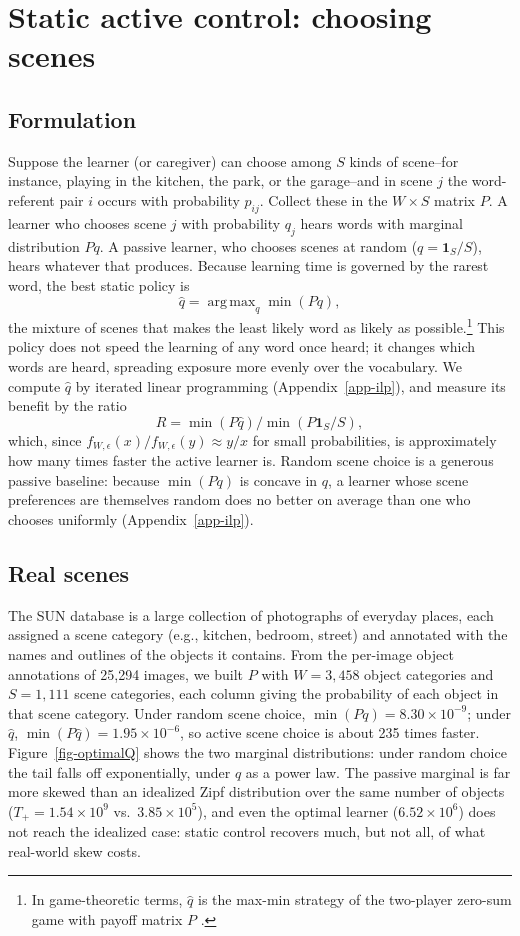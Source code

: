 \documentclass[a4paper,natbib,man]{apa6}
\newcommand{\one}[1]{\mathbf{1}_{#1}}
\DeclareMathOperator*{\argmax}{arg\,max}
\begin{document}
\section{Static active control: choosing scenes}
\label{sec-active}

\subsection{Formulation}
Suppose the learner (or caregiver) can choose among $S$ kinds of scene--for instance, playing in the kitchen, the park, or the garage--and in scene $j$ the word-referent pair $i$ occurs with probability $p_{ij}$. Collect these in the $W \times S$ matrix $P$. A learner who chooses scene $j$ with probability $q_j$ hears words with marginal distribution $Pq$. A passive learner, who chooses scenes at random ($q = \one{S}/S$), hears whatever that produces. Because learning time is governed by the rarest word, the best static policy is
\[
 \hat{q} = \argmax_{q} \min(Pq),
\]
the mixture of scenes that makes the least likely word as likely as possible.\footnote{In game-theoretic terms, $\hat{q}$ is the max-min strategy of the two-player zero-sum game with payoff matrix $P$ \citep{Maschler:2013}.} This policy does not speed the learning of any word once heard; it changes which words are heard, spreading exposure more evenly over the vocabulary. We compute $\hat q$ by iterated linear programming (Appendix~\ref{app-ilp}), and measure its benefit by the ratio
\[
R = \min(P \hat{q})/ \min(P \one{S}/S),
\]
which, since $f_{W,\epsilon}(x)/f_{W,\epsilon}(y) \approx y/x$ for small probabilities, is approximately how many times faster the active learner is. Random scene choice is a generous passive baseline: because $\min(Pq)$ is concave in $q$, a learner whose scene preferences are themselves random does no better on average than one who chooses uniformly (Appendix~\ref{app-ilp}).

\subsection{Real scenes}
The SUN database \citep{SUN2010} is a large collection of photographs of everyday places, each assigned a scene category (e.g., kitchen, bedroom, street) and annotated with the names and outlines of the objects it contains. From the per-image object annotations of 25,294 images, we built $P$ with $W = 3{,}458$ object categories and $S = 1{,}111$ scene categories, each column giving the probability of each object in that scene category. Under random scene choice, $\min(Pq) = 8.30\times 10^{-9}$; under $\hat q$, $\min(P\hat{q}) = 1.95\times 10^{-6}$, so active scene choice is about 235 times faster. Figure~\ref{fig-optimalQ} shows the two marginal distributions: under random choice the tail falls off exponentially, under $\hat q$ as a power law. The passive marginal is far more skewed than an idealized Zipf distribution over the same number of objects ($T_+ = 1.54 \times 10^9$ vs.\ $3.85\times10^5$), and even the optimal learner ($6.52\times10^6$) does not reach the idealized case: static control recovers much, but not all, of what real-world skew costs.
\end{document}

